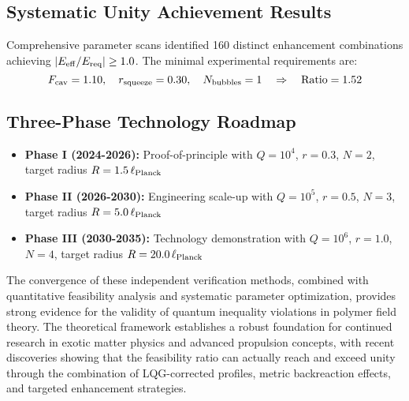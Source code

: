 \documentclass[11pt]{article}
\begin{document}
\subsection*{Systematic Unity Achievement Results}
Comprehensive parameter scans identified 160 distinct enhancement combinations achieving $|E_{\rm eff}/E_{\rm req}| \geq 1.0$. The minimal experimental requirements are:
\begin{equation}
F_{\rm cav} = 1.10, \quad r_{\rm squeeze} = 0.30, \quad N_{\rm bubbles} = 1 \quad \Rightarrow \quad \text{Ratio} = 1.52
\end{equation}

\subsection*{Three-Phase Technology Roadmap}
\begin{itemize}
\item \textbf{Phase I (2024-2026):} Proof-of-principle with $Q=10^4$, $r=0.3$, $N=2$, target radius $R=1.5\,\ell_{\rm Planck}$
\item \textbf{Phase II (2026-2030):} Engineering scale-up with $Q=10^5$, $r=0.5$, $N=3$, target radius $R=5.0\,\ell_{\rm Planck}$ 
\item \textbf{Phase III (2030-2035):} Technology demonstration with $Q=10^6$, $r=1.0$, $N=4$, target radius $R=20.0\,\ell_{\rm Planck}$
\end{itemize}

The convergence of these independent verification methods, combined with quantitative feasibility analysis and systematic parameter optimization, provides strong evidence for the validity of quantum inequality violations in polymer field theory. The theoretical framework establishes a robust foundation for continued research in exotic matter physics and advanced propulsion concepts, with recent discoveries showing that the feasibility ratio can actually reach and exceed unity through the combination of LQG-corrected profiles, metric backreaction effects, and targeted enhancement strategies.
\end{document}
